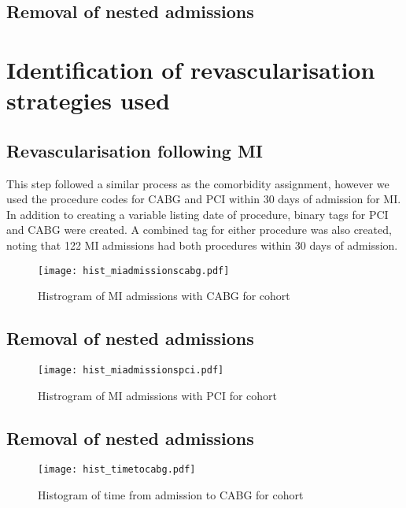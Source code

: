 \documentclass[11pt]{article}
\begin{document}
\subsection{Removal of nested admissions}
\color{violet}
\begin{stlog}\end{stlog}
\color{black}
\section{Identification of revascularisation strategies used}
\subsection{Revascularisation following MI}
This step followed a similar process as the comorbidity assignment, however we used the procedure codes for CABG and PCI within 30 days of admission for MI. In addition to creating a variable listing date of procedure, binary tags for PCI and CABG were created. A combined tag for either procedure was also created, noting that 122 MI admissions had both procedures within 30 days of admission. 
\color{violet}
\begin{stlog}\end{stlog}
\color{black}
\begin{figure} [h]
	\centering
	\texttt{[image: hist\_miadmissionscabg.pdf]}
	\caption{Histrogram of MI admissions with CABG for cohort}
	\label{hist_miadmissionscabg}
\end{figure}

\subsection{Removal of nested admissions}
\color{violet}
\begin{stlog}\end{stlog}
\color{black}
\begin{figure} [h]
	\centering
	\texttt{[image: hist\_miadmissionspci.pdf]}
	\caption{Histrogram of MI admissions with PCI for cohort}
	\label{hist_miadmissionspci}
\end{figure}

\subsection{Removal of nested admissions}
\color{violet}
\begin{stlog}\end{stlog}
\color{black}
\begin{figure} [h]
	\centering
	\texttt{[image: hist\_timetocabg.pdf]}
	\caption{Histogram of time from admission to CABG for cohort}
	\label{hist_timetocabg}
\end{figure}
\end{document}
